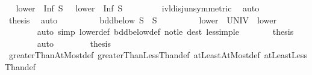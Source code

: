 \begin{isabellebody}
\ \isamarkupfalse%
\ {\isachardoublequoteopen}lower\ {\isacharequal}{\kern0pt}\ {\isacharbraceleft}{\kern0pt}Inf\ S\ {\isachardot}{\kern0pt}{\isachardot}{\kern0pt}{\isacharbraceright}{\kern0pt}\ {\isasymor}\ lower\ {\isacharequal}{\kern0pt}\ {\isacharbraceleft}{\kern0pt}Inf\ S\ {\isacharless}{\kern0pt}{\isachardot}{\kern0pt}{\isachardot}{\kern0pt}{\isacharbraceright}{\kern0pt}{\isachardoublequoteclose}\isanewline
\ \ \ \ \ \ \isamarkupfalse%
\ ivl{\isacharunderscore}{\kern0pt}disj{\isacharunderscore}{\kern0pt}un{\isacharparenleft}{\kern0pt}{}{\isacharparenright}{\kern0pt}{\isacharbrackleft}{\kern0pt}symmetric{\isacharbrackright}{\kern0pt}\ \isamarkupfalse%
\ auto\isanewline
\ \ \ \ \isamarkupfalse%
\ \isamarkupfalse%
\ {\isacharquery}{\kern0pt}thesis\ \isamarkupfalse%
\ auto\isanewline
\ \ \isamarkupfalse%
\isanewline
\ \ \ \ \isamarkupfalse%
\ {\isachardoublequoteopen}{\isasymnot}\ {\isacharparenleft}{\kern0pt}bdd{\isacharunderscore}{\kern0pt}below\ S\ {\isasymand}\ S\ {\isasymnoteq}\ {\isacharbraceleft}{\kern0pt}{\isacharbraceright}{\kern0pt}{\isacharparenright}{\kern0pt}{\isachardoublequoteclose}\isanewline
\ \ \ \ \isamarkupfalse%
\ \isamarkupfalse%
\ {\isachardoublequoteopen}lower\ {\isacharequal}{\kern0pt}\ UNIV\ {\isasymor}\ lower\ {\isacharequal}{\kern0pt}\ {\isacharbraceleft}{\kern0pt}{\isacharbraceright}{\kern0pt}{\isachardoublequoteclose}\isanewline
\ \ \ \ \ \ \isamarkupfalse%
\ {\isacharparenleft}{\kern0pt}auto\ simp{\isacharcolon}{\kern0pt}\ lower{\isacharunderscore}{\kern0pt}def\ bdd{\isacharunderscore}{\kern0pt}below{\isacharunderscore}{\kern0pt}def\ not{\isacharunderscore}{\kern0pt}le\ dest{\isacharcolon}{\kern0pt}\ less{\isacharunderscore}{\kern0pt}imp{\isacharunderscore}{\kern0pt}le{\isacharparenright}{\kern0pt}\isanewline
\ \ \ \ \isamarkupfalse%
\ \isamarkupfalse%
\ {\isacharquery}{\kern0pt}thesis\isanewline
\ \ \ \ \ \ \isamarkupfalse%
\ auto\isanewline
\ \ \isamarkupfalse%
\isanewline
\ \ \isamarkupfalse%
\ \isamarkupfalse%
\ {\isacharquery}{\kern0pt}thesis\isanewline
\ \ \ \ \isamarkupfalse%
\ greaterThanAtMost{\isacharunderscore}{\kern0pt}def\ greaterThanLessThan{\isacharunderscore}{\kern0pt}def\ atLeastAtMost{\isacharunderscore}{\kern0pt}def\ atLeastLessThan{\isacharunderscore}{\kern0pt}def\isanewline
\ \ \ \ \isamarkupfalse%

\end{isabellebody}

